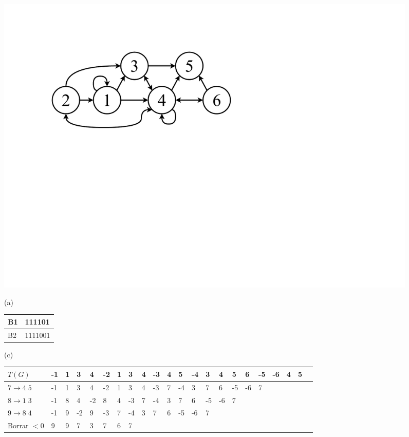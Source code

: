 \begin{figure}%
    	\centering
    	\begin{minipage}{1\textwidth}
    		\begin{minipage}{.6\textwidth}
    			\centering
    			\includegraphics[scale=.3, clip,  trim=90 330 350 90]{img/arte/graphs-repair.pdf}
    		
    			(a)
    		\end{minipage}
    		\begin{minipage}{.35\textwidth}
    			\centering
    			\vspace{5mm}
		    	\begin{tabular}{|l|l|}
		    		\hline
		    		B1 & 111101 \\
		    		\hline
		    		B2 & 1111001\\
		    		\hline
		    	\end{tabular}
		    	\vspace{5mm}
		    	
    			(c)
    		\end{minipage}
    	\end{minipage}
    	\vspace{5mm}
    	
    	\begin{minipage}{1\textwidth}
    		\centering

		\begin{tabular}{l||l|l|l|l|l|l|l|l|l|l|l|l|l|l|l|l|l|l|l|l|l|}
			\toprule
			$T(G)$ & -1 & 1 & 3 & 4 & -2 & 1 & 3 & 4 & -3 & 4 & 5 & -4 & 3 & 4 & 5 & 6 & -5 & -6 & 4 & 5 \\
			\midrule
			$7 \rightarrow 4 \; 5$ & -1 & 1 & 3 & 4 & -2 & 1 & 3 & 4 & -3 & 7 & -4 & 3 & 7 & 6 & -5 & -6 & 7 \\
			\cline{1-18}
			$8 \rightarrow 1 \; 3$ & -1 & 8 & 4 & -2 & 8 & 4 & -3 & 7 & -4 & 3 & 7 & 6 & -5 & -6 & 7 \\
			\cline{1-16}
			$9 \rightarrow 8 \; 4$ & -1 & 9 & -2 & 9 & -3 & 7 & -4 & 3 & 7 & 6 & -5 & -6 & 7 \\
			\cline{1-14}
			Borrar $<0$ & 9 & 9 & 7 & 3 & 7 & 6 & 7 \\
			\cline{1-8}
		\end{tabular}				
		\vspace{5mm}
		

\end{minipage}
\end{figure}
